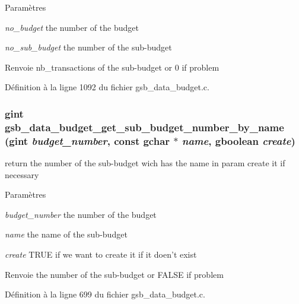 \begin{DoxyParams}{Paramètres}
\item[{\em no\_\-budget}]the number of the budget \item[{\em no\_\-sub\_\-budget}]the number of the sub-\/budget\end{DoxyParams}
\begin{DoxyReturn}{Renvoie}
nb\_\-transactions of the sub-\/budget or 0 if problem 
\end{DoxyReturn}


Définition à la ligne 1092 du fichier gsb\_\-data\_\-budget.c.

\subsubsection[{gsb\_\-data\_\-budget\_\-get\_\-sub\_\-budget\_\-number\_\-by\_\-name}]{\setlength{\rightskip}{0pt plus 5cm}gint gsb\_\-data\_\-budget\_\-get\_\-sub\_\-budget\_\-number\_\-by\_\-name (gint {\em budget\_\-number}, \/  const gchar $\ast$ {\em name}, \/  gboolean {\em create})}\label{gsb__data__budget_8c_a6d7e61d14b086448e7176f7681ce6087}
return the number of the sub-\/budget wich has the name in param create it if necessary


\begin{DoxyParams}{Paramètres}
\item[{\em budget\_\-number}]the number of the budget \item[{\em name}]the name of the sub-\/budget \item[{\em create}]TRUE if we want to create it if it doen't exist\end{DoxyParams}
\begin{DoxyReturn}{Renvoie}
the number of the sub-\/budget or FALSE if problem 
\end{DoxyReturn}


Définition à la ligne 699 du fichier gsb\_\-data\_\-budget.c.

